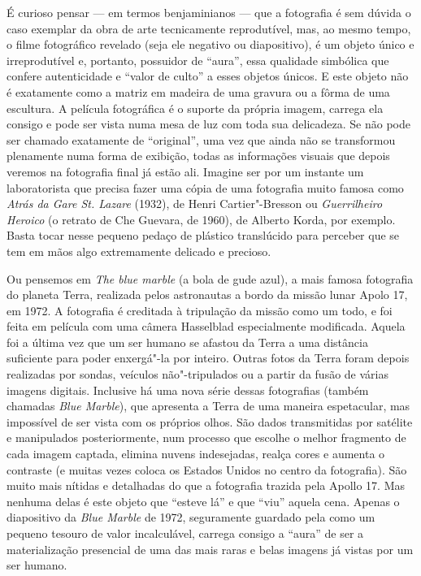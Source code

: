 É curioso pensar --- em termos benjaminianos --- que a fotografia é sem
dúvida o caso exemplar da obra de arte tecnicamente reprodutível, mas,
ao mesmo tempo, o filme fotográfico revelado (seja ele negativo ou
diapositivo), é um objeto único e irreprodutível e, portanto, possuidor
de ``aura'', essa qualidade simbólica que confere autenticidade e
``valor de culto'' a esses objetos únicos. E este objeto não é
exatamente como a matriz em madeira de uma gravura ou a fôrma de uma
escultura. A película fotográfica é o suporte da própria imagem, carrega
ela consigo e pode ser vista numa mesa de luz com toda sua delicadeza.
Se não pode ser chamado exatamente de ``original'', uma vez que ainda
não se transformou plenamente numa forma de exibição, todas as
informações visuais que depois veremos na fotografia final já estão ali.
Imagine ser por um instante um laboratorista que precisa fazer uma cópia
de uma fotografia muito famosa como \emph{Atrás da Gare St. Lazare}
(1932), de Henri Cartier"-Bresson ou \emph{Guerrilheiro Heroico} (o
retrato de Che Guevara, de 1960), de Alberto Korda, por exemplo. Basta
tocar nesse pequeno pedaço de plástico translúcido para perceber que se tem em
mãos algo extremamente delicado e precioso.

Ou pensemos em \emph{The blue marble} (a bola de gude azul), a mais
famosa fotografia do planeta Terra, realizada pelos astronautas a bordo
da missão lunar Apolo 17, em 1972. A fotografia é creditada à tripulação
da missão como um todo, e foi feita em película com uma câmera
Hasselblad especialmente modificada. Aquela foi a última vez que um ser
humano se afastou da Terra a uma distância suficiente para poder
enxergá"-la por inteiro. Outras fotos da Terra foram depois realizadas
por sondas, veículos não"-tripulados ou a partir da fusão de várias
imagens digitais. Inclusive há uma nova série dessas fotografias (também
chamadas \emph{Blue Marble}), que apresenta a Terra de uma maneira
espetacular, mas impossível de ser vista com os próprios olhos. São
dados transmitidas por satélite e manipulados posteriormente, num
processo que escolhe o melhor fragmento de cada imagem captada, elimina
nuvens indesejadas, realça cores e aumenta o contraste (e muitas vezes
coloca os Estados Unidos no centro da fotografia). São muito mais
nítidas e detalhadas do que a fotografia trazida pela Apollo 17. Mas
nenhuma delas é este objeto que ``esteve lá'' e que ``viu'' aquela cena.
Apenas o diapositivo da \emph{Blue Marble} de 1972, seguramente guardado
pela  como um pequeno tesouro de valor incalculável, carrega consigo
a ``aura'' de ser a materialização presencial de uma das mais raras e
belas imagens já vistas por um ser humano.

